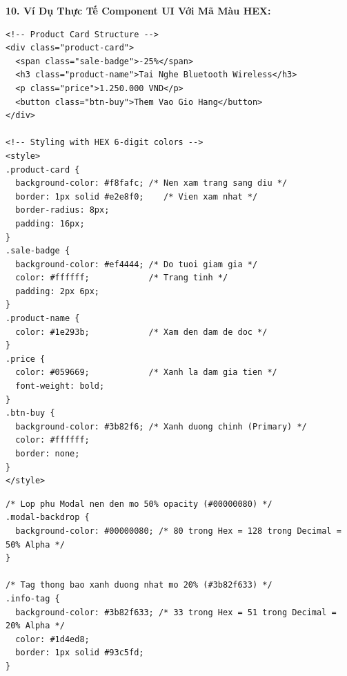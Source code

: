 \textbf{10. Ví Dụ Thực Tế Component UI Với Mã Màu HEX:}

\begin{codeWindow}
\begin{lstlisting}[language=HTML5]
<!-- Product Card Structure -->
<div class="product-card">
  <span class="sale-badge">-25%</span>
  <h3 class="product-name">Tai Nghe Bluetooth Wireless</h3>
  <p class="price">1.250.000 VND</p>
  <button class="btn-buy">Them Vao Gio Hang</button>
</div>

<!-- Styling with HEX 6-digit colors -->
<style>
.product-card {
  background-color: #f8fafc; /* Nen xam trang sang diu */
  border: 1px solid #e2e8f0;    /* Vien xam nhat */
  border-radius: 8px;
  padding: 16px;
}
.sale-badge {
  background-color: #ef4444; /* Do tuoi giam gia */
  color: #ffffff;            /* Trang tinh */
  padding: 2px 6px;
}
.product-name {
  color: #1e293b;            /* Xam den dam de doc */
}
.price {
  color: #059669;            /* Xanh la dam gia tien */
  font-weight: bold;
}
.btn-buy {
  background-color: #3b82f6; /* Xanh duong chinh (Primary) */
  color: #ffffff;
  border: none;
}
</style>
\end{lstlisting}
\end{codeWindow}

\begin{codeWindow}
\begin{lstlisting}[language=CSS3]
/* Lop phu Modal nen den mo 50% opacity (#00000080) */
.modal-backdrop {
  background-color: #00000080; /* 80 trong Hex = 128 trong Decimal = 50% Alpha */
}

/* Tag thong bao xanh duong nhat mo 20% (#3b82f633) */
.info-tag {
  background-color: #3b82f633; /* 33 trong Hex = 51 trong Decimal = 20% Alpha */
  color: #1d4ed8;
  border: 1px solid #93c5fd;
}
\end{lstlisting}
\end{codeWindow}

